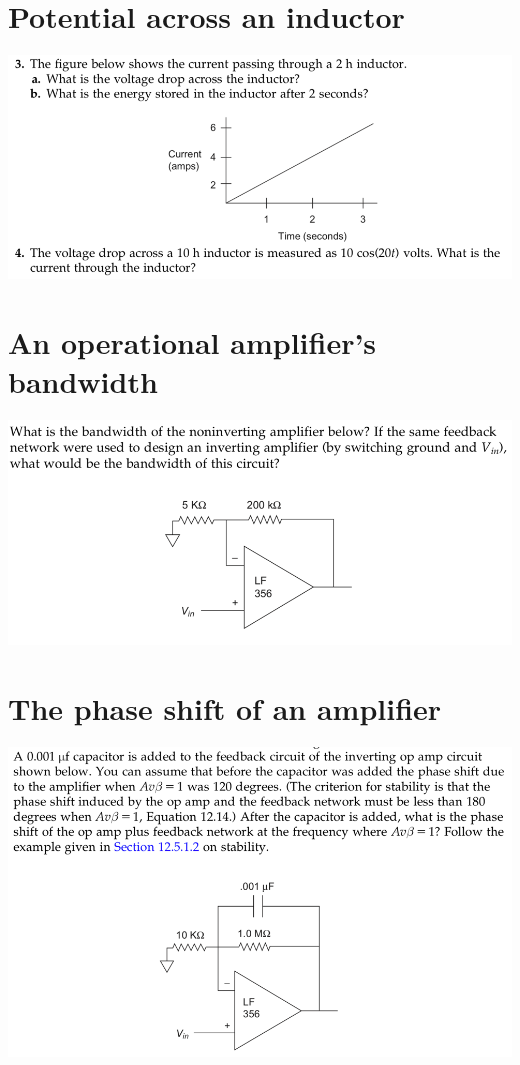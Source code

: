 \documentclass[11pt]{book}
\begin{document}
\newpage

\section{Potential across an inductor}
\begin{center}
	\includegraphics[width=\textwidth]{figures/q3.11.png}
\end{center}

\newpage

\section{An operational amplifier's bandwidth}
\begin{center}
	\includegraphics[width=\textwidth]{figures/q3.06.png}
\end{center}

\newpage

\section{The phase shift of an amplifier}
\begin{center}
	\includegraphics[width=\textwidth]{figures/q3.07.png}
\end{center}
\end{document}
